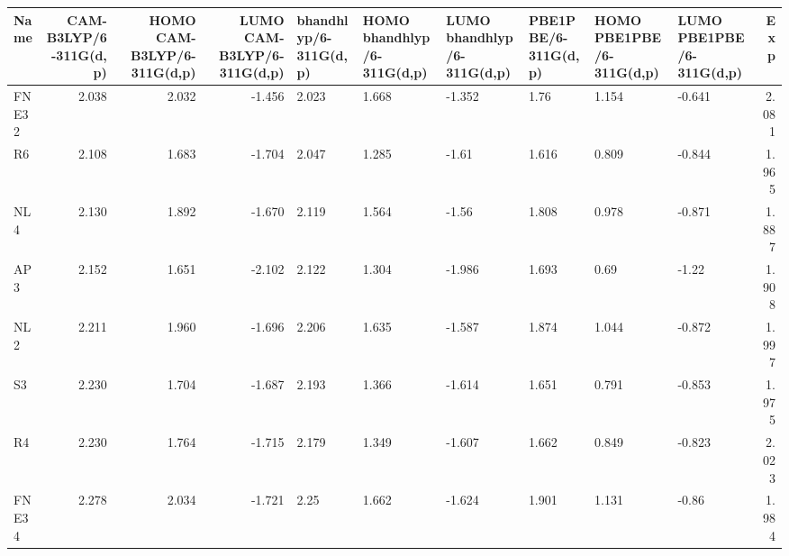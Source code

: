 \begin{tabular}{lrrrllllllr}
\toprule
          Name &  CAM-B3LYP/6-311G(d,p) &  HOMO CAM-B3LYP/6-311G(d,p) &  LUMO CAM-B3LYP/6-311G(d,p) & bhandhlyp/6-311G(d,p) & HOMO bhandhlyp/6-311G(d,p) & LUMO bhandhlyp/6-311G(d,p) & PBE1PBE/6-311G(d,p) & HOMO PBE1PBE/6-311G(d,p) & LUMO PBE1PBE/6-311G(d,p) &   Exp \\
\midrule
         FNE32 &                  2.038 &                       2.032 &                      -1.456 &                 2.023 &                      1.668 &                     -1.352 &                1.76 &                    1.154 &                   -0.641 & 2.081 \\
            R6 &                  2.108 &                       1.683 &                      -1.704 &                 2.047 &                      1.285 &                      -1.61 &               1.616 &                    0.809 &                   -0.844 & 1.965 \\
           NL4 &                  2.130 &                       1.892 &                      -1.670 &                 2.119 &                      1.564 &                      -1.56 &               1.808 &                    0.978 &                   -0.871 & 1.887 \\
           AP3 &                  2.152 &                       1.651 &                      -2.102 &                 2.122 &                      1.304 &                     -1.986 &               1.693 &                     0.69 &                    -1.22 & 1.908 \\
           NL2 &                  2.211 &                       1.960 &                      -1.696 &                 2.206 &                      1.635 &                     -1.587 &               1.874 &                    1.044 &                   -0.872 & 1.997 \\
            S3 &                  2.230 &                       1.704 &                      -1.687 &                 2.193 &                      1.366 &                     -1.614 &               1.651 &                    0.791 &                   -0.853 & 1.975 \\
            R4 &                  2.230 &                       1.764 &                      -1.715 &                 2.179 &                      1.349 &                     -1.607 &               1.662 &                    0.849 &                   -0.823 & 2.023 \\
         FNE34 &                  2.278 &                       2.034 &                      -1.721 &                  2.25 &                      1.662 &                     -1.624 &               1.901 &                    1.131 &                    -0.86 & 1.984 \\

\end{tabular}

